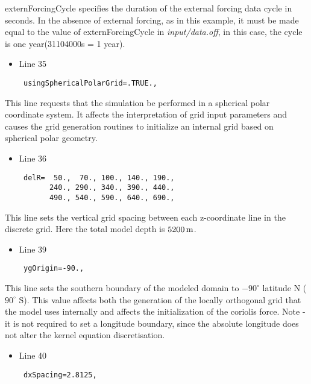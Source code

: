 \noindent externForcingCycle specifies the duration of the external
forcing data cycle in seconds. In the absence of external forcing, as
in this example, it must be made equal to the value of
externForcingCycle in {\it input/data.off}, in this case, the cycle is
one year(31104000s = 1 year).

\begin{itemize}
\item Line 35
\begin {verbatim}
 usingSphericalPolarGrid=.TRUE.,
\end{verbatim}
\end{itemize}

\noindent This line requests that the simulation be performed in a
spherical polar coordinate system. It affects the interpretation of
grid input parameters and causes the grid generation routines to
initialize an internal grid based on spherical polar geometry.

\begin{itemize}
\item Line 36
\begin {verbatim}
 delR=  50.,  70., 100., 140., 190., 
       240., 290., 340., 390., 440., 
       490., 540., 590., 640., 690.,
\end{verbatim}
\end{itemize}

\noindent This line sets the vertical grid spacing between each
z-coordinate line in the discrete grid. Here the total model depth is
$5200\,{\rm m}$.

\begin{itemize}
\item Line 39
\begin {verbatim}
 ygOrigin=-90.,
\end{verbatim}
\end{itemize}

\noindent This line sets the southern boundary of the modeled domain
to $-90^{\circ}$ latitude N ($90^{\circ}$ S). This value affects both 
the generation of the
locally orthogonal grid that the model uses internally and affects the
initialization of the coriolis force.  Note - it is not required to
set a longitude boundary, since the absolute longitude does not alter
the kernel equation discretisation.

\begin{itemize}
\item Line 40
\begin {verbatim}
 dxSpacing=2.8125,
\end{verbatim}
\end{itemize}


